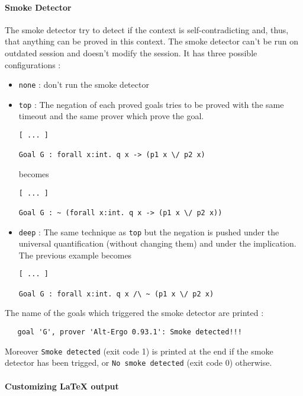 \paragraph{Smoke Detector}
 The smoke detector try to detect if the context is self-contradicting
 and, thus, that anything can be proved in this context. The smoke
 detector can't be run on outdated session and doesn't modify the session.
 It has three possible configurations :
 \begin{itemize}
 \item \texttt{none} : don't run the smoke detector
 \item \texttt{top} : The negation of each proved goals
   tries to be proved with the same timeout and the same prover which
   prove the goal.
\begin{verbatim}
[ ... ]

Goal G : forall x:int. q x -> (p1 x \/ p2 x)
\end{verbatim}
becomes
\begin{verbatim}
[ ... ]

Goal G : ~ (forall x:int. q x -> (p1 x \/ p2 x))
\end{verbatim}
 \item \texttt{deep} : The same technique as \texttt{top} but the
   negation is pushed under the universal quantification (without
   changing them) and under the implication. The previous example becomes
\begin{verbatim}
[ ... ]

Goal G : forall x:int. q x /\ ~ (p1 x \/ p2 x)
\end{verbatim}
 \end{itemize}

The name of the goals which triggered the smoke detector are printed :
\begin{verbatim}
   goal 'G', prover 'Alt-Ergo 0.93.1': Smoke detected!!!
\end{verbatim}
Moreover \texttt{Smoke detected} (exit code 1) is printed at the end if the smoke
detector has been trigged, or \texttt{No smoke detected} (exit code 0)
otherwise.


\paragraph{Customizing LaTeX output}

